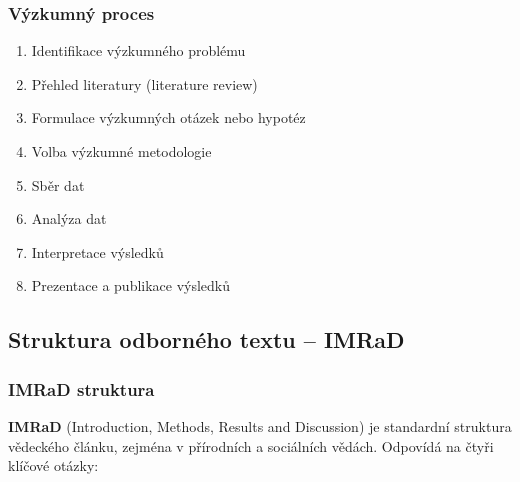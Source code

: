 \subsubsection{Výzkumný proces}

\begin{enumerate}
  \item Identifikace výzkumného problému
  \item Přehled literatury (literature review)
  \item Formulace výzkumných otázek nebo hypotéz
  \item Volba výzkumné metodologie
  \item Sběr dat
  \item Analýza dat
  \item Interpretace výsledků
  \item Prezentace a publikace výsledků
\end{enumerate}

\subsection{Struktura odborného textu -- IMRaD}

\subsubsection{IMRaD struktura}

\textbf{IMRaD} (Introduction, Methods, Results and Discussion) je standardní struktura vědeckého článku,
zejména v přírodních a sociálních vědách. Odpovídá na čtyři klíčové otázky:

